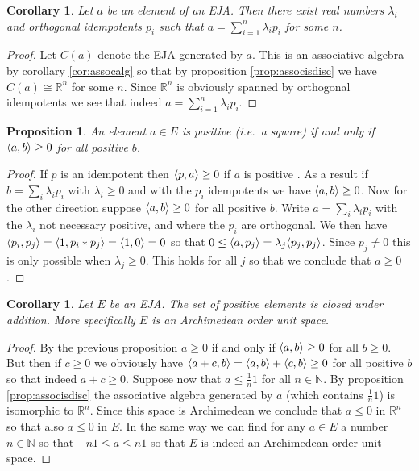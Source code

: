 \documentclass[submission,copyright,creativecommons]{eptcs}
\newcounter{main}
\newtheorem{proposition}[main]{Proposition}
\newtheorem{corollary}[main]{Corollary}
\theoremstyle{definition}
\DeclarePairedDelimiter{\inn}{\langle}{\rangle}
\newcommand\R{\mathbb{R}}
\newcommand\N{\mathbb{N}}
\begin{document}
\begin{corollary}\label{cor:spectral}
    Let $a$ be an element of an EJA. Then there exist real numbers $\lambda_i$ and orthogonal idempotents $p_i$ such that $a = \sum_{i=1}^n \lambda_i p_i$ for some $n$.
\end{corollary}
\begin{proof}
    Let $C(a)$ denote the EJA generated by $a$. This is an associative algebra by corollary \ref{cor:assocalg} so that by proposition \ref{prop:associsdisc} we have $C(a)\cong \R^n$ for some $n$. Since $\R^n$ is obviously spanned by orthogonal idempotents we see that indeed $a= \sum_{i=1}^n \lambda_i p_i$.
\end{proof}

\begin{proposition}\label{prop:selfduality}
    An element $a\in E$ is positive (i.e.\ a square) if and only if $\inn{a,b}\geq 0$ for all positive $b$.
\end{proposition}
\begin{proof}
    If $p$ is an idempotent then $\inn{p,a}\geq 0$ if $a$ is positive \cite[p. 107]{chu2011jordan}. As a result if $b=\sum_i \lambda_i p_i$ with $\lambda_i \geq 0$ and with the $p_i$ idempotents we have $\inn{a,b}\geq 0$. Now for the other direction suppose $\inn{a,b}\geq 0$ for all positive $b$. Write $a=\sum_i \lambda_i p_i$ with the $\lambda_i$ not necessary positive, and where the $p_i$ are orthogonal. We then have $\inn{p_i,p_j} = \inn{1,p_i*p_j} = \inn{1,0} = 0$ so that $0\leq \inn{a,p_j} = \lambda_j \inn{p_j,p_j}$. Since $p_j\neq 0$ this is only possible when $\lambda_j\geq 0$. This holds for all $j$ so that we conclude that $a\geq 0$.
\end{proof}
\begin{corollary}\label{cor:ejaous}
    Let $E$ be an EJA. The set of positive elements is closed under addition. More specifically $E$ is an Archimedean order unit space.
\end{corollary}
\begin{proof}
    By the previous proposition $a\geq 0$ if and only if $\inn{a,b}\geq 0$ for all $b\geq 0$. But then if $c\geq 0$ we obviously have $\inn{a+c,b} = \inn{a,b}+\inn{c,b} \geq 0$ for all positive $b$ so that indeed $a+c\geq 0$. Suppose now that $a\leq \frac{1}{n}1$ for all $n\in \N$. By proposition \ref{prop:associsdisc} the associative algebra generated by $a$ (which contains $\frac{1}{n}1$) is isomorphic to $\R^n$. Since this space is Archimedean we conclude that $a\leq 0$ in $\R^n$ so that also $a\leq 0$ in $E$. In the same way we can find for any $a\in E$ a number $n\in \N$ so that $-n1 \leq a\leq n1$ so that $E$ is indeed an Archimedean order unit space.
\end{proof}
\end{document}
